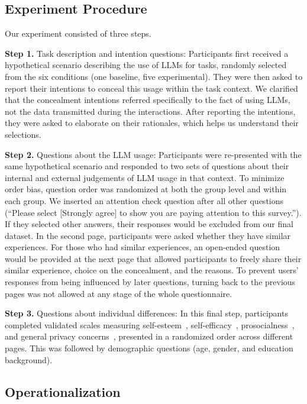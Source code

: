 \subsection{Experiment Procedure}
\label{sec:experiment-procedure}
Our experiment consisted of three steps.

\textbf{Step 1.} Task description and intention questions: 
Participants first received a hypothetical scenario describing the use of LLMs for tasks, randomly selected from the six conditions (one baseline, five experimental).
They were then asked to report their intentions to conceal this usage within the task context.
We clarified that the concealment intentions referred specifically to the fact of using LLMs, not the data transmitted during the interactions.
After reporting the intentions, they were asked to elaborate on their rationales, which helps us understand their selections.

\textbf{Step 2.} Questions about the LLM usage: 
Participants were re-presented with the same hypothetical scenario and responded to two sets of questions about their internal and external judgements of LLM usage in that context.
To minimize order bias, question order was randomized at both the group level and within each group.
We inserted an attention check question after all other questions (``Please select [Strongly agree] to show you are paying attention to this survey.''). 
If they selected other answers, their responses would be excluded from our final dataset.
In the second page, participants were asked whether they have similar experiences. 
For those who had similar experiences, an open-ended question would be provided at the next page that allowed participants to freely share their similar experience, choice on the concealment, and the reasons. 
To prevent users' responses from being influenced by later questions, turning back to the previous pages was not allowed at any stage of the whole questionnaire.


\textbf{Step 3.} Questions about individual differences: 
In this final step, participants completed validated scales measuring self-esteem~\cite{rosenberg1965rosenberg}, self-efficacy~\cite{schwarzer1995generalized}, prosocialness~\cite{caprara2005new}, and general privacy concerns~\cite{malhotra2004internet}, presented in a randomized order across different pages. 
This was followed by demographic questions (age, gender, and education background).



\subsection{Operationalization}

